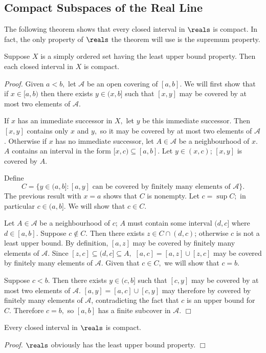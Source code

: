 \subsection{Compact Subspaces of the Real Line}
The following theorem shows that every closed interval in $\reals$ is compact. In fact, the only property of $\reals$ the theorem will use is the supremum property.

\begin{theorem}\label{3.34}
    Suppose $X$ is a simply ordered set having the least upper bound property. Then each closed interval in $X$ is compact.
\end{theorem}
{\it Proof.} Given $a<b,$ let $\mathcal{A}$ be an open covering of $[a, b].$ We will first show that if $x \in [a, b)$ then there exists $y \in (x, b]$ such that $[x, y]$ may be covered by at most two elements of $\mathcal{A}.$

If $x$ has an immediate successor in $X,$ let $y$ be this immediate successor. Then $[x, y]$ contains only $x$ and $y,$ so it may be covered by at most two elements of $\mathcal{A}$. Otherwise if $x$ has no immediate successor, let $A \in \mathcal{A}$ be a neighbourhood of $x.$ $A$ contains an interval in the form $[x, c) \subseteq [a, b].$ Let $y \in (x, c)$; $[x, y]$ is covered by $A.$

Define
$$C = \{y \in (a, b]: [a, y] \text{ can be covered by finitely many elements of } \mathcal{A}\}.$$
The previous result with $x = a$ shows that $C$ is nonempty. Let $c = \sup C;$ in particular $c \in (a, b].$ We will show that $c \in C.$

Let $A \in \mathcal{A}$ be a neighbourhood of $c$; $A$ must contain some interval $(d, c]$ where $d \in [a, b].$ Suppose $c \notin C.$ Then there exists $z \in C \cap (d, c)$; otherwise $c$ is not a least upper bound. By definition, $[a, z]$ may be covered by finitely many elements of $\mathcal{A}.$ Since $[z, c] \subseteq (d, c] \subseteq A,$ $[a, c] = [a, z] \cup [z, c]$ may be covered by finitely many elements of $\mathcal{A}.$ Given that $c \in C,$ we will show that $c = b.$

Suppose $c < b.$ Then there exists $y \in (c, b]$ such that $[c, y]$ may be covered by at most two elements of $\mathcal{A}$. $[a, y] = [a, c] \cup [c, y]$ may therefore by covered by finitely many elements of $\mathcal{A}$, contradicting the fact that $c$ is an upper bound for $C.$ Therefore $c = b,$ so $[a, b]$ has a finite subcover in $\mathcal{A}.$ $\Box$

\begin{corollary}\label{3.35}
    Every closed interval in $\reals$ is compact.
\end{corollary}
{\it Proof.} $\reals$ obviously has the least upper bound property. $\Box$

